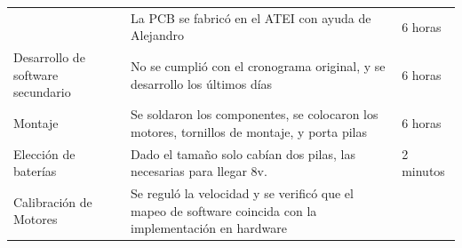 \begin{longtable}[]{@{}lll@{}}
\begin{minipage}[t]{0.17\columnwidth}
\end{minipage} & \begin{minipage}[t]{0.64\columnwidth}\raggedright
La PCB se fabricó en el ATEI con ayuda de Alejandro\strut
\end{minipage} & \begin{minipage}[t]{0.10\columnwidth}\raggedright
6 horas\strut
\end{minipage}\tabularnewline
\begin{minipage}[t]{0.17\columnwidth}\raggedright
Desarrollo de software secundario\strut
\end{minipage} & \begin{minipage}[t]{0.64\columnwidth}\raggedright
No se cumplió con el cronograma original, y se desarrollo los últimos
días\strut
\end{minipage} & \begin{minipage}[t]{0.10\columnwidth}\raggedright
6 horas\strut
\end{minipage}\tabularnewline
\begin{minipage}[t]{0.17\columnwidth}\raggedright
Montaje\strut
\end{minipage} & \begin{minipage}[t]{0.64\columnwidth}\raggedright
Se soldaron los componentes, se colocaron los motores, tornillos de
montaje, y porta pilas\strut
\end{minipage} & \begin{minipage}[t]{0.10\columnwidth}\raggedright
6 horas\strut
\end{minipage}\tabularnewline
\begin{minipage}[t]{0.17\columnwidth}\raggedright
Elección de baterías\strut
\end{minipage} & \begin{minipage}[t]{0.64\columnwidth}\raggedright
Dado el tamaño solo cabían dos pilas, las necesarias para llegar
8v.\strut
\end{minipage} & \begin{minipage}[t]{0.10\columnwidth}\raggedright
2 minutos\strut
\end{minipage}\tabularnewline
\begin{minipage}[t]{0.17\columnwidth}\raggedright
Calibración de Motores\strut
\end{minipage} & \begin{minipage}[t]{0.64\columnwidth}\raggedright
Se reguló la velocidad y se verificó que el mapeo de software coincida
con la implementación en hardware\strut
\end{minipage} & \begin{minipage}[t]{0.10\columnwidth}\raggedright

\end{minipage}
\end{longtable}
